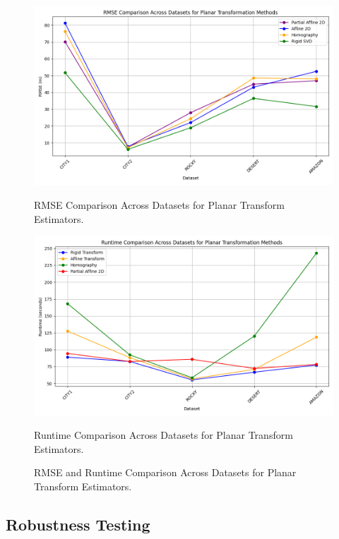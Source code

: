 \begin{figure}[H]
    \centering
    \begin{minipage}{0.45\textwidth}
        \centering
        \includegraphics[width=\textwidth]{./Chapter 4/testresults/rmse_planar_estimators.png}
        \caption{RMSE Comparison Across Datasets for Planar Transform Estimators.}
    \end{minipage}\hfill
    \begin{minipage}{0.45\textwidth}
        \centering
        \includegraphics[width=\textwidth]{./Chapter 4/testresults/runtime_planar_estimators.png}
        \caption{Runtime Comparison Across Datasets for Planar Transform Estimators.}
    \end{minipage}
    \caption{RMSE and Runtime Comparison Across Datasets for Planar Transform Estimators.}
    \label{fig:rmse_runtime_comparison_rotestim}
\end{figure}
   
    

\subsection{Robustness Testing}

